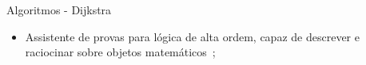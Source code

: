 \begin{frame}{Algoritmos - Dijkstra}
    \begin{itemize}
        \item Assistente de provas para lógica de alta ordem, capaz de descrever e raciocinar sobre objetos matemáticos~\cite{geuvers2009proof};
    \end{itemize}
\end{frame}